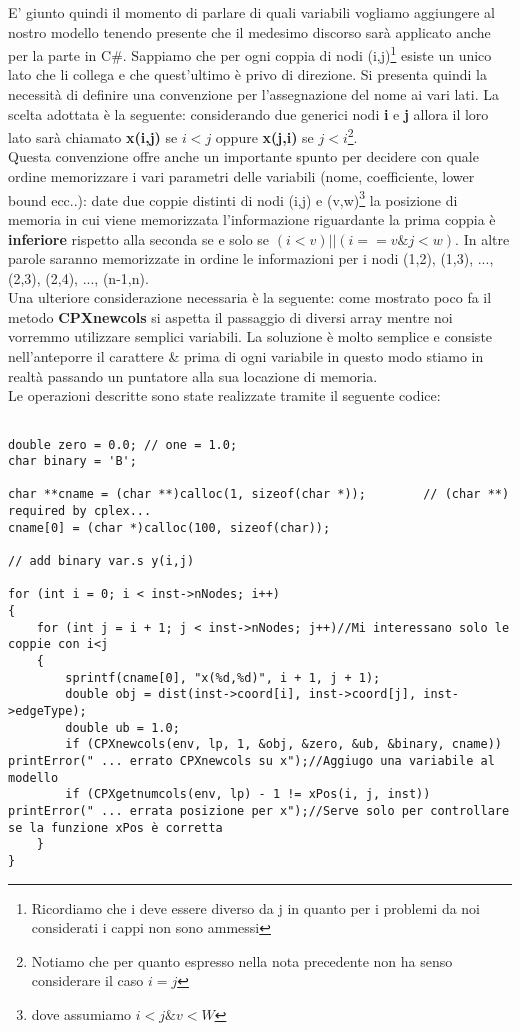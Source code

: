 \documentclass[11pt]{article}
\begin{document}
E' giunto quindi il momento di parlare di quali variabili vogliamo aggiungere al nostro modello tenendo presente che il medesimo discorso sarà applicato anche per la parte in C\#. Sappiamo che per ogni coppia di nodi (i,j)\footnote{Ricordiamo che i deve essere diverso da j in quanto per i problemi da noi considerati i cappi non sono ammessi} esiste un unico lato che li collega e che quest'ultimo è privo di direzione. Si presenta quindi la necessità di definire una convenzione per l'assegnazione del nome ai vari lati. La scelta adottata è la seguente: considerando due generici nodi \textbf{i} e \textbf{j} allora il loro lato sarà chiamato \textbf{x(i,j)} se $i<j$ oppure \textbf{x(j,i)} se $j<i$\footnote{Notiamo che per quanto espresso nella nota precedente non ha senso considerare il caso $i=j$}.\\
Questa convenzione offre anche un importante spunto per decidere con quale ordine memorizzare i vari parametri delle variabili (nome, coefficiente, lower bound ecc..): date due coppie distinti di nodi (i,j) e (v,w)\footnote{dove assumiamo $i<j \& v<W$} la posizione di memoria in cui viene memorizzata l'informazione riguardante la prima coppia è \textbf{inferiore} rispetto alla seconda se e solo se $(i<v) || (i==v \& j<w)$. In altre parole saranno memorizzate in ordine le informazioni per i nodi (1,2), (1,3), ..., (2,3), (2,4), ..., (n-1,n).\\
Una ulteriore considerazione necessaria è la seguente: come mostrato poco fa il metodo \textbf{CPXnewcols} si aspetta il passaggio di diversi array mentre noi vorremmo utilizzare semplici variabili. La soluzione è molto semplice e consiste nell'anteporre il carattere \& prima di ogni variabile in questo modo stiamo in realtà passando un puntatore alla sua locazione di memoria.\\

Le operazioni descritte sono state realizzate tramite il seguente codice:

\begin{lstlisting}

double zero = 0.0; // one = 1.0;     
char binary = 'B';

char **cname = (char **)calloc(1, sizeof(char *));        // (char **) required by cplex...
cname[0] = (char *)calloc(100, sizeof(char));

// add binary var.s y(i,j)      

for (int i = 0; i < inst->nNodes; i++)
{
    for (int j = i + 1; j < inst->nNodes; j++)//Mi interessano solo le coppie con i<j
    {
        sprintf(cname[0], "x(%d,%d)", i + 1, j + 1);
        double obj = dist(inst->coord[i], inst->coord[j], inst->edgeType);
        double ub = 1.0;
        if (CPXnewcols(env, lp, 1, &obj, &zero, &ub, &binary, cname)) printError(" ... errato CPXnewcols su x");//Aggiugo una variabile al modello
        if (CPXgetnumcols(env, lp) - 1 != xPos(i, j, inst)) printError(" ... errata posizione per x");//Serve solo per controllare se la funzione xPos è corretta
    }
}

\end{lstlisting}
\end{document}
